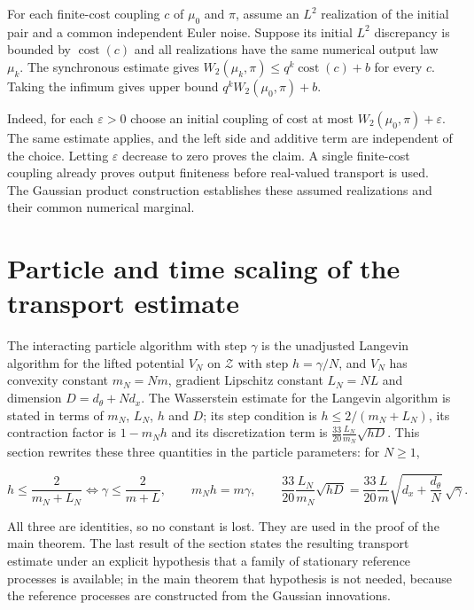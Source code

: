\documentclass[11pt,a4paper]{report}
\begin{document}
For each finite-cost coupling \(c\) of \(\mu_0\) and \(\pi\), assume an \(L^2\) realization of the initial pair and a common independent Euler noise. Suppose its initial \(L^2\) discrepancy is bounded by \(\operatorname{cost}(c)\) and all realizations have the same numerical output law \(\mu_k\). The synchronous estimate gives \(W_2(\mu_k,\pi)\le q^k\operatorname{cost}(c)+b\) for every \(c\). Taking the infimum gives upper bound \(q^kW_2(\mu_0,\pi)+b\).



Indeed, for each \(\varepsilon>0\) choose an initial coupling of cost at most \(W_2(\mu_0,\pi)+\varepsilon\). The same estimate applies, and the left side and additive term are independent of the choice. Letting \(\varepsilon\) decrease to zero proves the claim. A single finite-cost coupling already proves output finiteness before real-valued transport is used. The Gaussian product construction establishes these assumed realizations and their common numerical marginal.


\section{\texorpdfstring{Particle and time scaling of the transport estimate}{Particle and time scaling of the transport estimate}}
\label{proof-module-IPLA-Scaling-lean}


The interacting particle algorithm with step \(\gamma\) is the unadjusted Langevin algorithm for the lifted potential \(V_N\) on \(\mathcal Z\) with step \(h=\gamma/N\), and \(V_N\) has convexity constant \(m_N=Nm\), gradient Lipschitz constant \(L_N=NL\) and dimension \(D=d_\theta+Nd_x\). The Wasserstein estimate for the Langevin algorithm is stated in terms of \(m_N\), \(L_N\), \(h\) and \(D\); its step condition is \(h\le2/(m_N+L_N)\), its contraction factor is \(1-m_Nh\) and its discretization term is \(\frac{33}{20}\frac{L_N}{m_N}\sqrt{hD}\). This section rewrites these three quantities in the particle parameters: for \(N\ge1\),


\[h\le\frac2{m_N+L_N}\iff\gamma\le\frac2{m+L},\qquad m_Nh=m\gamma,\qquad\frac{33}{20}\frac{L_N}{m_N}\sqrt{hD}=\frac{33}{20}\frac Lm\sqrt{d_x+\frac{d_\theta}N}\,\sqrt\gamma .\]


All three are identities, so no constant is lost. They are used in the proof of the main theorem. The last result of the section states the resulting transport estimate under an explicit hypothesis that a family of stationary reference processes is available; in the main theorem that hypothesis is not needed, because the reference processes are constructed from the Gaussian innovations.
\end{document}
